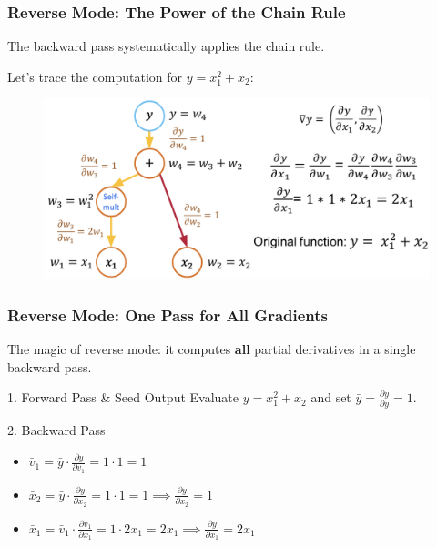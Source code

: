 \documentclass[notes]{beamer}
\begin{document}
\begin{frame}
	\frametitle{Reverse Mode: The Power of the Chain Rule}
	
	The backward pass systematically applies the chain rule.
	
	Let's trace the computation for $y = x_1^2 + x_2$:
	
	\begin{figure}[ht]
		\centering
		\includegraphics[width=\textwidth]{figs/ad6.png}
	\end{figure}
	
\end{frame}


\begin{frame}
\frametitle{Reverse Mode: One Pass for All Gradients}

The magic of reverse mode: it computes \textbf{all} partial derivatives in a single backward pass.

\begin{block}{1. Forward Pass \& Seed Output}
Evaluate $y = x_1^2 + x_2$ and set $\bar{y} = \frac{\partial y}{\partial y} = 1$.
\end{block}

\begin{block}{2. Backward Pass}
\begin{itemize}
    \item $\bar{v}_1 = \bar{y} \cdot \frac{\partial y}{\partial v_1} = 1 \cdot 1 = 1$
    \item $\bar{x}_2 = \bar{y} \cdot \frac{\partial y}{\partial x_2} = 1 \cdot 1 = 1 \implies \frac{\partial y}{\partial x_2} = 1$
    \item $\bar{x}_1 = \bar{v}_1 \cdot \frac{\partial v_1}{\partial x_1} = 1 \cdot 2x_1 = 2x_1 \implies \frac{\partial y}{\partial x_1} = 2x_1$
\end{itemize}
\end{block}

\end{frame}
\end{document}
